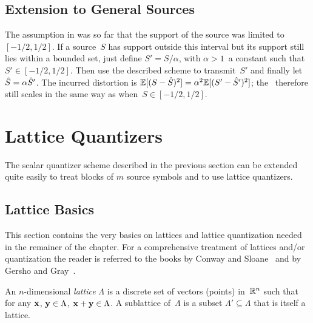 


\subsection{Extension to General Sources}

The assumption in  was so far that the support of the source
was limited to~$[-1/2,1/2]$. If a source~$S$ has support outside this interval
but its support still lies within a bounded set, just define $S' = S/\alpha$,
with $\alpha > 1$~a constant such that $S' \in [-1/2, 1/2]$. Then use the
described scheme to transmit~$S'$ and finally let ${\hat{S}} = \alpha {\hat{S}}'$. The
incurred distortion is $\mathbb{E}[(S - {\hat{S}})^2] = \alpha^2 \mathbb{E}[(S' - {\hat{S}}')^2]$; the \sdr\
therefore still scales in the same way as when~$S \in [-1/2, 1/2]$.



\section{Lattice Quantizers}\label{sec:latticequant}

The scalar quantizer scheme described in the previous section can be extended
quite easily to treat blocks of $m$ source symbols and to use lattice
quantizers. 


\subsection{Lattice Basics}

This section contains the very basics on lattices and lattice quantization
needed in the remainer of the chapter. For a comprehensive treatment of lattices
and/or quantization the reader is referred to the books by Conway and
Sloane~\cite{ConwayS1988} and by Gersho and Gray~\cite{GershoG1992}.

\begin{definition}
  An $n$-dimensional \emph{lattice} $\Lambda$ is a discrete set of vectors
  (points) in~$\mathbb{R}^n$ such that for any $\mathbf{x}$, $\mathbf{y} \in \Lambda$, $\mathbf{x} + \mathbf{y} \in
  \Lambda$. A sublattice of~$\Lambda$ is a subset $\Lambda' \subseteq \Lambda$
  that is itself a lattice. 
\end{definition}

